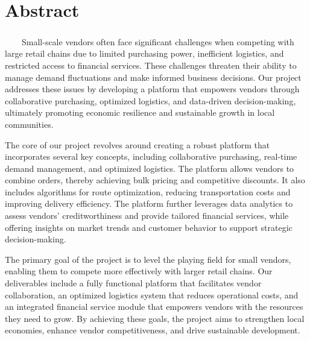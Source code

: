 \chapter*{Abstract}
\vspace{1.5cm}
\paragraph{}\ \ \ \ Small-scale vendors often face significant challenges when competing with large retail chains due to limited purchasing power, inefficient logistics, and restricted access to financial services. These challenges threaten their ability to manage demand fluctuations and make informed business decisions. Our project addresses these issues by developing a platform that empowers vendors through collaborative purchasing, optimized logistics, and data-driven decision-making, ultimately promoting economic resilience and sustainable growth in local communities.

The core of our project revolves around creating a robust platform that incorporates several key concepts, including collaborative purchasing, real-time demand management, and optimized logistics. The platform allows vendors to combine orders, thereby achieving bulk pricing and competitive discounts. It also includes algorithms for route optimization, reducing transportation costs and improving delivery efficiency. The platform further leverages data analytics to assess vendors' creditworthiness and provide tailored financial services, while offering insights on market trends and customer behavior to support strategic decision-making.

The primary goal of the project is to level the playing field for small vendors, enabling them to compete more effectively with larger retail chains. Our deliverables include a fully functional platform that facilitates vendor collaboration, an optimized logistics system that reduces operational costs, and an integrated financial service module that empowers vendors with the resources they need to grow. By achieving these goals, the project aims to strengthen local economies, enhance vendor competitiveness, and drive sustainable development.
